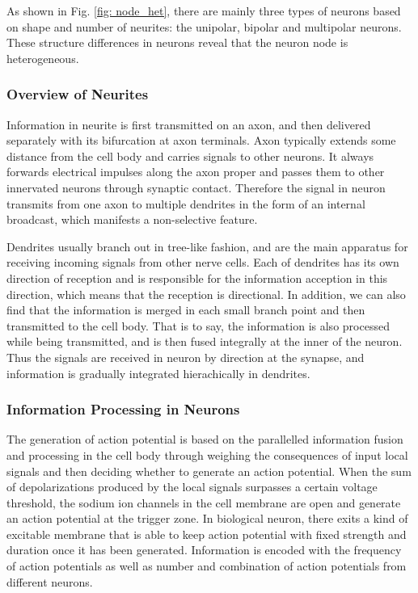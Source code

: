 \documentclass[journal,comsoc]{IEEEtran}
\begin{document}
				As shown in Fig. \ref{fig: node_het}, there are mainly three types of neurons based on shape and number of neurites: the unipolar, bipolar and multipolar neurons\cite{bear2007neuroscience}. 
				These structure differences in neurons reveal that the neuron node is heterogeneous.
				
			\subsubsection{Overview of Neurites}
				Information in neurite is first transmitted on an axon, and then delivered separately with its bifurcation at axon terminals. 
				Axon typically extends some distance from the cell body and carries signals to other neurons.
				It always forwards electrical impulses along the axon proper and passes them to other innervated neurons through synaptic contact. 
				Therefore the signal in neuron transmits from one axon to multiple dendrites in the form of an internal broadcast, which manifests a non-selective feature.
				
				Dendrites usually branch out in tree-like fashion, and are the main apparatus for receiving incoming signals from other nerve cells. 
				Each of dendrites has its own direction of reception and is responsible for the information acception in this direction, 
				which means that the reception is directional. 
				In addition, we can also find that the information is merged in each small branch point and then transmitted to the cell body.
				That is to say, the information is also processed while being transmitted,  and is then fused integrally at the inner of the neuron.
				Thus the signals are received in neuron by direction at the synapse, and information is gradually integrated hierachically in dendrites.				
		
			\subsubsection{Information Processing in Neurons}
				The generation of action potential is based on the parallelled information fusion and processing in the cell body through weighing the consequences of input local signals and then deciding whether to generate an action potential. 
				When the sum of depolarizations produced by the local signals surpasses a certain voltage threshold, the sodium ion channels in the cell membrane are open and generate an action potential at the trigger zone. 
				In biological neuron, there exits a kind of excitable membrane that is able to keep action potential with fixed strength and duration once it has been generated.
				Information is encoded with the frequency of action potentials as well as number and combination of action potentials from different neurons\cite{bear2007neuroscience}. 
\end{document}
